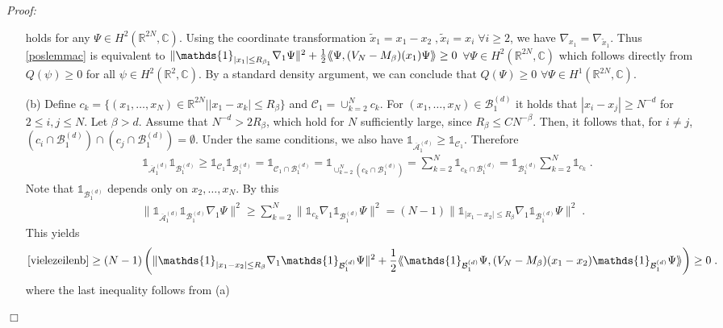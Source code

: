 \documentclass[11pt, english, american]{article}
\newcommand{\laa}{\langle\hspace{-0.08cm}\langle}
\newcommand{\raa}{\rangle\hspace{-0.08cm}\rangle}
\newenvironment{proof}{\emph{Proof:}}{\begin{flushright} $ \Box $ \end{flushright}}
\begin{document}
\begin{proof}
\begin{itemize}
holds for  any $\Psi\in H^2(\mathbb{R}^{2N},\mathbb{C})$.
Using the coordinate transformation $\tilde{x}_1= x_1-x_2 \; , \tilde{x}_i=x_i \; \forall i \geq 2$, we have $\nabla_{x_1}= \nabla_{\tilde{x}_1}$. Thus \eqref{poslemmac} is equivalent to $
\|\mathds{1}_{|x_1|\leq  R_{\beta_1}}\nabla_1\Psi\|^2+\frac{1}{2}\laa\Psi,
(V_{N}-M_{\beta})(x_1)\Psi\raa
 \geq 0$ $\forall \Psi \in H^2(\mathbb{R}^{2N},\mathbb{C})$
which follows directly from $Q(\psi) \geq 0$ for all $\psi\in H^2(\mathbb{R}^{2},\mathbb{C})$.
By a standard density argument, we can conclude that $Q(\Psi) \geq 0$ $\forall \Psi \in H^1(\mathbb{R}^{2N},\mathbb{C})$.
\item[(b)]
Define 
$c_k= \lbrace
(x_1,\dots,x_N) \in \mathbb{R}^{2N}| |x_1-x_k|\leq R_\beta \rbrace$ and 
$\mathcal{C}_1= \cup_{k=2}^N c_k$.
For  $(x_1, \dots, x_N) \in \mathcal{B}^{(d)}_{1}$ it holds that
 $|x_i-x_j| \geq  N^{-d}$ for $2 \leq i,j \leq N$.
Let $  \beta >d$. Assume that $N^{-d} > 2 R_\beta$, which hold for $N$ sufficiently large, since $R_\beta \leq CN^{-\beta}$.
Then, it follows that, for $i \neq j$, 
 $ \left( c_i \cap \mathcal{B}^{(d)}_{1} \right)
  \cap
  \left( c_j \cap \mathcal{B}^{(d)}_{1} \right)= \emptyset$.
 Under the same conditions, we also have $\mathds{1}_{\overline{\mathcal{A}}^{(d)}_{1}} \geq \mathds{1}_{\mathcal{C}_{1}}$.   
 Therefore
 \begin{align*}
& 
\mathds{1}_{\overline{\mathcal{A}}^{(d)}_{1}} \mathds{1}_{\mathcal{B}^{(d)}_{1}}
\geq 
\mathds{1}_{\mathcal{C}_{1}} \mathds{1}_{\mathcal{B}^{(d)}_{1}}
 = \mathds{1}_{\mathcal{C}_{1} \cap \mathcal{B}^{(d)}_{1} }
 = \mathds{1}_{ \cup_{k=2}^N  \left( c_k \cap \mathcal{B}^{(d)}_{1} \right) }
 = \sum_{k=2}^N \mathds{1}_{c_k \cap \mathcal{B}^{(d)}_{1} }
 =\mathds{1}_{ \mathcal{B}^{(d)}_{1} } 
 \sum_{k=2}^N \mathds{1}_{c_k  }
 \;.
 \end{align*}
 Note that $\mathds{1}_{\mathcal{B}^{(d)}_{1}}$  depends only on $x_2, \dots, x_N$. By this
 \begin{align*}
\| \mathds{1}_{\overline{\mathcal{A}}^{(d)}_{1}} \mathds{1}_{\mathcal{B}^{(d)}_{1}}
\nabla_1 \Psi \|^2
\geq
\sum_{k=2}^N
\|
 \mathds{1}_{c_k  }
\nabla_1 \mathds{1}_{ \mathcal{B}^{(d)}_{1} } \Psi \|^2
=
(N-1)
\|
 \mathds{1}_{|x_1-x_2| \leq  R_\beta }
\nabla_1 \mathds{1}_{ \mathcal{B}^{(d)}_{1} } \Psi \|^2
\;.
 \end{align*}
This yields
 \begin{align*}
 \eqref{vielezeilenb}
 \geq
 (N-1)
 \left(
 \|
 \mathds{1}_{|x_1-x_2| \leq  R_\beta }
\nabla_1 \mathds{1}_{ \mathcal{B}^{(d)}_{1} } \Psi \|^2
+
\frac{1}{2}\laa \mathds{1}_{ \mathcal{B}^{(d)}_{1} } \Psi,
(V_{N}-M_{\beta})(x_1-x_2)\mathds{1}_{ \mathcal{B}^{(d)}_{1} } \Psi\raa
 \right)
 \geq 0
 \;.
 \end{align*}
  where the last inequality follows from (a)
\end{itemize}
\end{proof}
\end{document}
